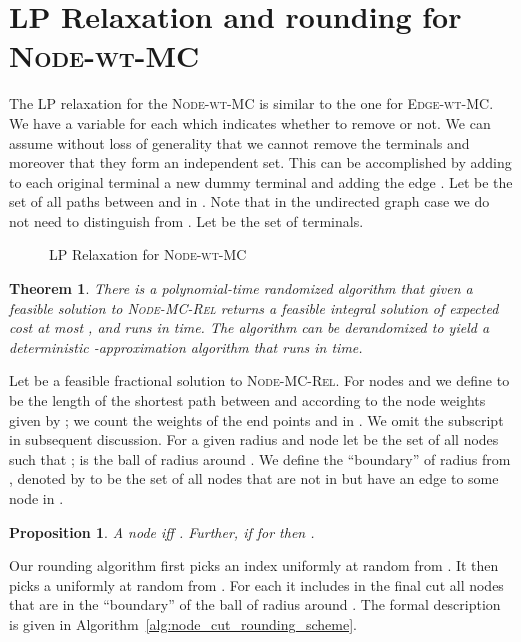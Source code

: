 \documentclass[11pt]{article}
\newtheorem{theorem}[lemma]{Theorem}
\newtheorem{prop}[lemma]{Proposition}
\def\MC{\textsc{Edge-wt-MC}\xspace}
\def\NodeMC{\textsc{Node-wt-MC}\xspace}
\def\NodeMC{\textsc{Node-wt-MC}\xspace}
\def\NodeMCRel{\textsc{Node-MC-Rel}\xspace}
\begin{document}
\section{LP Relaxation and rounding for \NodeMC}
\label{sec:node-mc}

The LP relaxation for the \NodeMC
is similar to the one for \MC. We
have a variable  for each  which indicates
whether to remove  or not. We can assume without loss of generality
that we cannot remove the terminals  and moreover
that they form an independent set. This can be accomplished by adding
to each original terminal  a new dummy terminal  and
adding the edge . Let  be the set of all 
paths between  and  in . Note that in the undirected graph
case we do not need to distinguish  from . Let  be the set of terminals.
\begin{figure}[htb]
  \centering
\begin{boxedminipage}{0.5\linewidth}
\vspace{-0.2in}

\end{boxedminipage}
  \caption{LP Relaxation for \NodeMC}
  \label{fig:nodemc-lp}
\end{figure}


\begin{theorem}\label{thm:node_cut_approximation}
  There is a polynomial-time randomized algorithm that given a
  feasible solution  to {\sc \NodeMCRel} returns a feasible
  integral solution of expected cost at most , and runs in  time.  The algorithm can be
  derandomized to yield a deterministic -approximation algorithm
  that runs in  time.
\end{theorem}

Let  be a feasible fractional solution to \NodeMCRel.  For nodes
 and  we define  to be the length of the shortest path
between  and  according to the node weights given by ; we
count the weights of the end points  and  in . We omit
the subscript  in subsequent discussion.  For a given radius 
and node  let  be the set of all nodes  such that
;  is the ball of radius  around . 
We define the ``boundary'' of radius  from , denoted by
 to be the set of all nodes that are not in  but
have an edge to some node in .

\begin{prop}
  \label{prop:node-boundary}
  A node  iff . Further, 
  if  for  then .
\end{prop}

Our rounding algorithm first picks an index  uniformly at random
from . It then picks a  uniformly at random
from . For each  it includes in the final cut 
all nodes  that are in the ``boundary'' of the ball of radius
 around .  The formal description is given in
Algorithm~\ref{alg:node_cut_rounding_scheme}.
\end{document}
